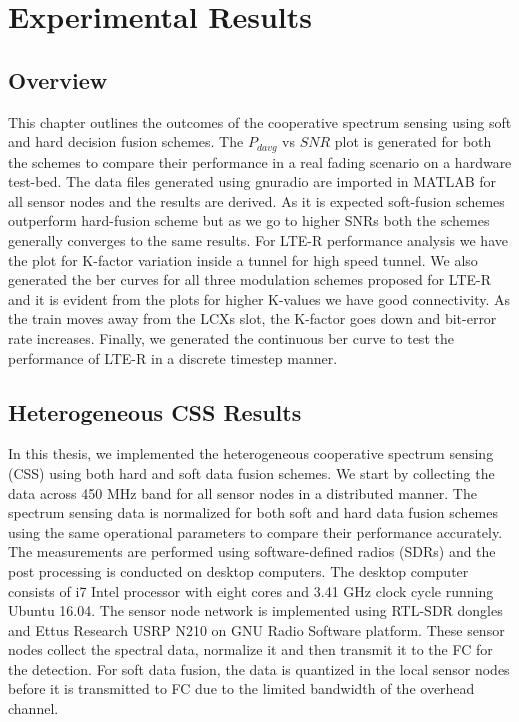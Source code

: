\chapter{Experimental Results}
\label{chapter6}
\section{Overview} 
This chapter outlines the outcomes of the cooperative spectrum sensing using soft and hard decision fusion schemes. The $P_{davg}$ vs $SNR$ plot is generated for both the schemes to compare their performance in a real fading scenario on a hardware test-bed. The data files generated using gnuradio are imported in MATLAB for all sensor nodes and the results are derived. As it is expected soft-fusion schemes outperform hard-fusion scheme but as we go to higher SNRs both the schemes generally converges to the same results. For LTE-R performance analysis we have the plot for K-factor variation inside a tunnel for high speed tunnel. We also generated the ber curves for all three modulation schemes proposed for LTE-R and it is evident from the plots for higher K-values we have good connectivity. As the train moves away from the LCXs slot, the K-factor goes down and bit-error rate increases. Finally, we generated the continuous ber curve to test the performance of LTE-R in a discrete timestep manner.

\section{Heterogeneous CSS Results}
In this thesis, we implemented the heterogeneous cooperative spectrum sensing (CSS) using both hard and soft data fusion schemes. We start by collecting the data across 450 MHz band for all sensor nodes in a distributed manner. The spectrum sensing data is normalized for both soft and hard data fusion schemes using the same operational parameters to compare their performance accurately. The measurements are performed using software-defined radios (SDRs) and the post processing is conducted on desktop computers. The desktop computer consists of i7 Intel processor with eight cores and 3.41 GHz clock cycle running Ubuntu 16.04. The sensor node network is implemented using RTL-SDR dongles and Ettus Research USRP N210 on GNU Radio Software platform.
These sensor nodes collect the spectral data, normalize it and then transmit it to the FC for the detection. For soft data fusion, the data is quantized in the local sensor nodes before it is transmitted to FC due to the limited bandwidth of the overhead channel. 

